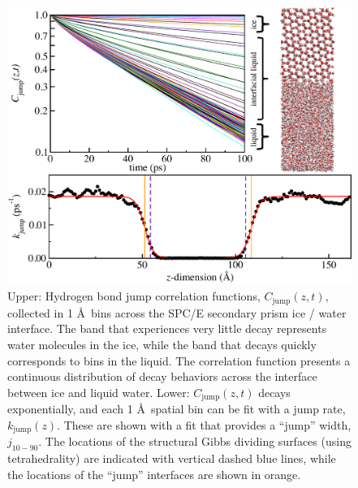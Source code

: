 \begin{figure}
\includegraphics[width=5.5in]{Figures/secPrismJumpPlot}
\caption{\label{fig:SPkjmp} Upper: Hydrogen bond jump correlation
  functions, $C_\mathrm{jump}(z,t)$, collected in 1 \AA~bins across
  the SPC/E secondary prism ice / water interface. The band that
  experiences very little decay represents water molecules in the ice,
  while the band that decays quickly corresponds to bins in the
  liquid.  The correlation function presents a continuous distribution
  of decay behaviors across the interface between ice and liquid
  water.  Lower: $C_\mathrm{jump}(z,t)$ decays exponentially, and each
  1 \AA~spatial bin can be fit with a jump rate, $k_\mathrm{jump}(z)$.
  These are shown with a fit that provides a ``jump'' width,
  $j_\mathrm{10-90}$. The locations of the structural Gibbs dividing
  surfaces (using tetrahedrality) are indicated with vertical dashed
  blue lines, while the locations of the ``jump'' interfaces are shown in
  orange.}
\end{figure}


